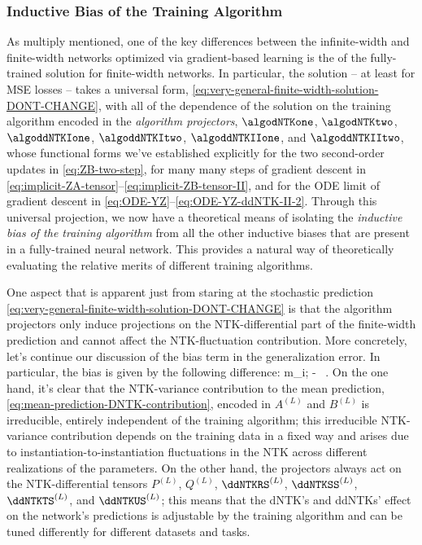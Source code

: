 \subsubsection{Inductive Bias of the Training Algorithm}
As multiply mentioned, one of the key differences between the infinite-width and finite-width networks optimized via gradient-based learning is the  of the fully-trained solution for finite-width networks. In particular, the solution -- at least for MSE losses -- takes a universal form, \eqref{eq:very-general-finite-width-solution-DONT-CHANGE}, with all of the dependence of the solution on the training algorithm encoded in  the \emph{algorithm projectors},
$\algodNTKone$, $\algodNTKtwo$, $\algoddNTKIone$, $\algoddNTKItwo$, $\algoddNTKIIone$, and $\algoddNTKIItwo$, 
whose functional forms we've established explicitly for the two second-order updates in \eqref{eq:ZB-two-step}, for many many steps of gradient descent in \eqref{eq:implicit-ZA-tensor}--\eqref{eq:implicit-ZB-tensor-II}, and for the ODE limit of gradient descent in \eqref{eq:ODE-YZ}--\eqref{eq:ODE-YZ-ddNTK-II-2}. Through this universal projection, we now have a theoretical means of isolating the \emph{inductive bias of the training algorithm} from all the other inductive biases that are present in a fully-trained neural network. This provides a natural way of theoretically evaluating the relative merits of different training algorithms.

One aspect that is apparent just from staring at the stochastic prediction \eqref{eq:very-general-finite-width-solution-DONT-CHANGE} is that the algorithm projectors only induce projections on the NTK-differential part of the finite-width prediction and cannot affect the NTK-fluctuation contribution.
More concretely, let's continue our discussion of the bias term in the generalization error. In particular, the bias is given by the following difference:
\be
m_{i;\tea} -  \, .
\ee
On the one hand, it's clear that the NTK-variance contribution to the mean prediction, \eqref{eq:mean-prediction-DNTK-contribution}, 
encoded in $A^{(L)}$ and $B^{(L)}$ is irreducible, entirely independent of the training algorithm; 
this irreducible NTK-variance contribution depends on the training data in a fixed way and arises due to instantiation-to-instantiation fluctuations in the NTK across different realizations of the parameters.
On the other hand, the projectors always act on the NTK-differential tensors $P^{(L)}$, $Q^{(L)}$, $\ddNTKRS^{(L)}$, $\ddNTKSS^{(L)}$, $\ddNTKTS^{(L)}$, and $\ddNTKUS^{(L)}$; this  means that the dNTK's and ddNTKs' effect on the network's predictions is adjustable by the training algorithm and can be tuned differently for different datasets and tasks.

